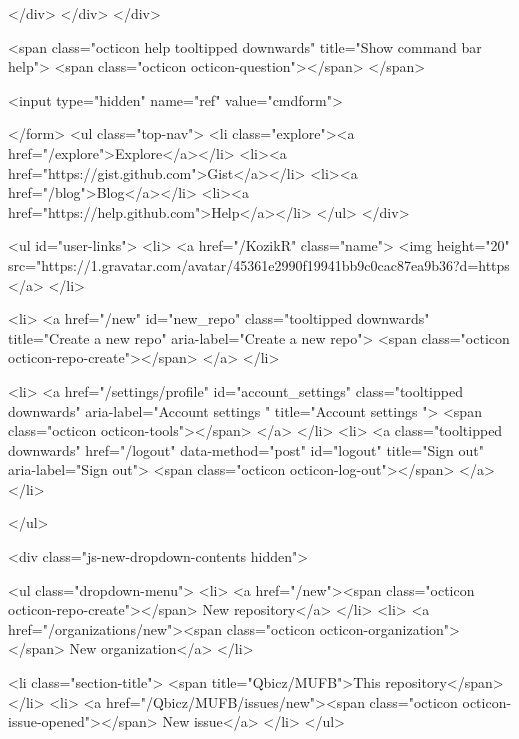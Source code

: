         </div>
      </div>
    </div>

  <span class="octicon help tooltipped downwards" title="Show command bar help">
    <span class="octicon octicon-question"></span>
  </span>


  <input type="hidden" name="ref" value="cmdform">

</form>
        <ul class="top-nav">
          <li class="explore"><a href="/explore">Explore</a></li>
            <li><a href="https://gist.github.com">Gist</a></li>
            <li><a href="/blog">Blog</a></li>
          <li><a href="https://help.github.com">Help</a></li>
        </ul>
      </div>

    


  <ul id="user-links">
    <li>
      <a href="/KozikR" class="name">
        <img height="20" src="https://1.gravatar.com/avatar/45361e2990f19941bb9c0cac87ea9b36?d=https%
      </a>
    </li>

      <li>
        <a href="/new" id="new_repo" class="tooltipped downwards" title="Create a new repo" aria-label="Create a new repo">
          <span class="octicon octicon-repo-create"></span>
        </a>
      </li>

      <li>
        <a href="/settings/profile" id="account_settings"
          class="tooltipped downwards"
          aria-label="Account settings "
          title="Account settings ">
          <span class="octicon octicon-tools"></span>
        </a>
      </li>
      <li>
        <a class="tooltipped downwards" href="/logout" data-method="post" id="logout" title="Sign out" aria-label="Sign out">
          <span class="octicon octicon-log-out"></span>
        </a>
      </li>

  </ul>

<div class="js-new-dropdown-contents hidden">
  

<ul class="dropdown-menu">
  <li>
    <a href="/new"><span class="octicon octicon-repo-create"></span> New repository</a>
  </li>
  <li>
    <a href="/organizations/new"><span class="octicon octicon-organization"></span> New organization</a>
  </li>



    <li class="section-title">
      <span title="Qbicz/MUFB">This repository</span>
    </li>
      <li>
        <a href="/Qbicz/MUFB/issues/new"><span class="octicon octicon-issue-opened"></span> New issue</a>
      </li>
</ul>

